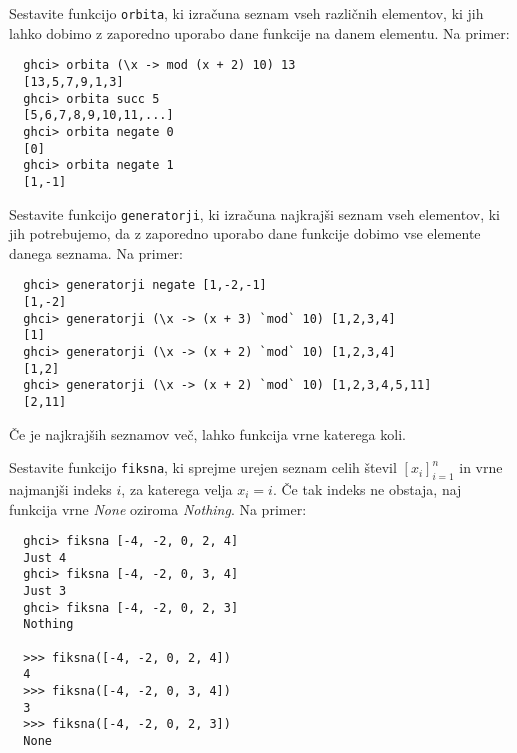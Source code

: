 \documentclass[arhiv]{../izpit}
\begin{document}



\podnaloga
  Sestavite funkcijo \texttt{orbita}, ki izračuna seznam vseh različnih
  elementov, ki jih lahko dobimo z zaporedno uporabo dane funkcije na danem
  elementu. Na primer:
  \begin{verbatim}
  ghci> orbita (\x -> mod (x + 2) 10) 13
  [13,5,7,9,1,3]
  ghci> orbita succ 5
  [5,6,7,8,9,10,11,...]
  ghci> orbita negate 0
  [0]
  ghci> orbita negate 1
  [1,-1]
  \end{verbatim}

\podnaloga
  Sestavite funkcijo \texttt{generatorji}, ki izračuna najkrajši seznam vseh
  elementov, ki jih potrebujemo, da z zaporedno uporabo dane funkcije dobimo
  vse elemente danega seznama. Na primer:
  \begin{verbatim}
  ghci> generatorji negate [1,-2,-1]
  [1,-2]
  ghci> generatorji (\x -> (x + 3) `mod` 10) [1,2,3,4]
  [1]
  ghci> generatorji (\x -> (x + 2) `mod` 10) [1,2,3,4]
  [1,2]
  ghci> generatorji (\x -> (x + 2) `mod` 10) [1,2,3,4,5,11]
  [2,11] 
  \end{verbatim}
  Če je najkrajših seznamov več, lahko funkcija vrne katerega koli.



  Sestavite funkcijo \texttt{fiksna}, ki sprejme urejen seznam celih števil 
  $[x_i]_{i=1}^n$ in vrne najmanjši indeks $i$, za katerega velja $x_i = i$.
  Če tak indeks ne obstaja, naj funkcija vrne {\sl None} oziroma {\sl Nothing}.
  Na primer:

  \begin{verbatim}
  ghci> fiksna [-4, -2, 0, 2, 4]
  Just 4
  ghci> fiksna [-4, -2, 0, 3, 4]
  Just 3
  ghci> fiksna [-4, -2, 0, 2, 3]
  Nothing

  >>> fiksna([-4, -2, 0, 2, 4])
  4
  >>> fiksna([-4, -2, 0, 3, 4])
  3
  >>> fiksna([-4, -2, 0, 2, 3])
  None
  \end{verbatim}   

 
\end{document}
